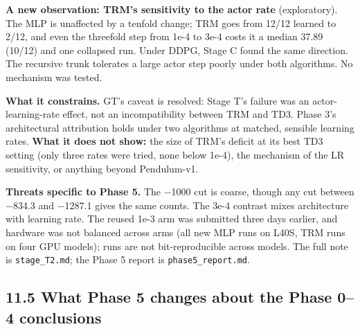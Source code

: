 \documentclass[11pt]{article}
\begin{document}
\textbf{A new observation: TRM's sensitivity to the actor rate} (exploratory). The MLP is unaffected by a tenfold change; TRM goes from 12/12 learned to 2/12, and even the threefold step from 1e-4 to 3e-4 costs it a median 37.89 (10/12) and one collapsed run. Under DDPG, Stage C found the same direction. The recursive trunk tolerates a large actor step poorly under both algorithms. No mechanism was tested.



\textbf{What it constrains.} GT's caveat is resolved: Stage T's failure was an actor-learning-rate effect, not an incompatibility between TRM and TD3. Phase 3's architectural attribution holds under two algorithms at matched, sensible learning rates. \textbf{What it does not show:} the size of TRM's deficit at its best TD3 setting (only three rates were tried, none below 1e-4), the mechanism of the LR sensitivity, or anything beyond Pendulum-v1.



\textbf{Threats specific to Phase 5.} The $-$1000 cut is coarse, though any cut between $-$834.3 and $-$1287.1 gives the same counts. The 3e-4 contrast mixes architecture with learning rate. The reused 1e-3 arm was submitted three days earlier, and hardware was not balanced across arms (all new MLP runs on L40S, TRM runs on four GPU models); runs are not bit-reproducible across models. The full note is \texttt{stage\_T2.md}; the Phase 5 report is \texttt{phase5\_\allowbreak{}report.\allowbreak{}md}.



\subsection*{11.5 What Phase 5 changes about the Phase 0--4 conclusions}
\end{document}
